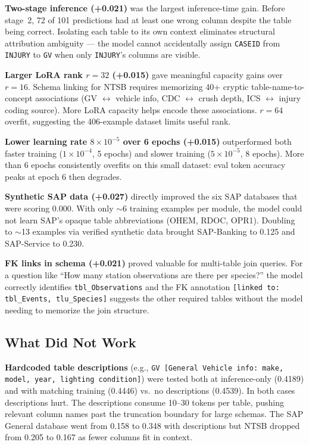 \documentclass[10pt,twocolumn]{article}
\begin{document}
\textbf{Two-stage inference (+0.021)} was the largest inference-time gain. Before stage~2, 72 of 101 predictions had at least one wrong column despite the table being correct. Isolating each table to its own context eliminates structural attribution ambiguity — the model cannot accidentally assign \texttt{CASEID} from \texttt{INJURY} to \texttt{GV} when only \texttt{INJURY}'s columns are visible.

\textbf{Larger LoRA rank $r=32$ (+0.015)} gave meaningful capacity gains over $r=16$. Schema linking for NTSB requires memorizing 40+ cryptic table-name-to-concept associations (GV $\leftrightarrow$ vehicle info, CDC $\leftrightarrow$ crush depth, ICS $\leftrightarrow$ injury coding source). More LoRA capacity helps encode these associations. $r=64$ overfit, suggesting the 406-example dataset limits useful rank.

\textbf{Lower learning rate $8\times10^{-5}$ over 6 epochs (+0.015)} outperformed both faster training ($1\times10^{-4}$, 5 epochs) and slower training ($5\times10^{-5}$, 8 epochs). More than 6 epochs consistently overfits on this small dataset: eval token accuracy peaks at epoch 6 then degrades.

\textbf{Synthetic SAP data (+0.027)} directly improved the six SAP databases that were scoring 0.000. With only $\sim$6 training examples per module, the model could not learn SAP's opaque table abbreviations (OHEM, RDOC, OPR1). Doubling to $\sim$13 examples via verified synthetic data brought SAP-Banking to 0.125 and SAP-Service to 0.230.

\textbf{FK links in schema (+0.021)} proved valuable for multi-table join queries. For a question like ``How many station observations are there per species?'' the model correctly identifies \texttt{tbl\_Observations} and the FK annotation \texttt{[linked to: tbl\_Events, tlu\_Species]} suggests the other required tables without the model needing to memorize the join structure.

\subsection*{What Did Not Work}

\textbf{Hardcoded table descriptions} (e.g., \texttt{GV [General Vehicle info: make, model, year, lighting condition]}) were tested both at inference-only (0.4189) and with matching training (0.4446) vs.\ no descriptions (0.4539). In both cases descriptions hurt. The descriptions consume 10--30 tokens per table, pushing relevant column names past the truncation boundary for large schemas. The SAP General database went from 0.158 to 0.348 with descriptions but NTSB dropped from 0.205 to 0.167 as fewer columns fit in context.
\end{document}

